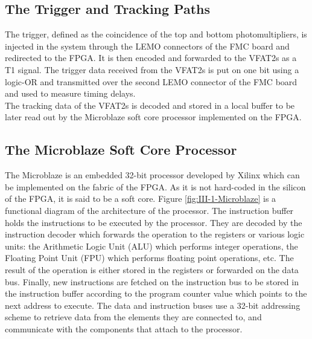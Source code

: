     \subsection{The Trigger and Tracking Paths}

      The trigger, defined as the coincidence of the top and bottom photomultipliers, is injected in the system through the LEMO connectors of the FMC board and redirected to the FPGA. It is then encoded and forwarded to the VFAT2s as a T1 signal. The trigger data received from the VFAT2s is put on one bit using a logic-OR and transmitted over the second LEMO connector of the FMC board and used to measure timing delays. \\

      The tracking data of the VFAT2s is decoded and stored in a local buffer to be later read out by the Microblaze soft core processor implemented on the FPGA.

    \subsection{The Microblaze Soft Core Processor}

      The Microblaze \cite{Microblaze} is an embedded 32-bit processor developed by Xilinx which can be implemented on the fabric of the FPGA. As it is not hard-coded in the silicon of the FPGA, it is said to be a soft core. Figure \ref{fig:III-1-Microblaze} is a functional diagram of the architecture of the processor. The instruction buffer holds the instructions to be executed by the processor. They are decoded by the instruction decoder which forwards the operation to the registers or various logic units: the Arithmetic Logic Unit (ALU) which performs integer operations, the Floating Point Unit (FPU) which performs floating point operations, etc. The result of the operation is either stored in the registers or forwarded on the data bus. Finally, new instructions are fetched on the instruction bus to be stored in the instruction buffer according to the program counter value which points to the next address to execute. The data and instruction buses use a 32-bit addressing scheme to retrieve data from the elements they are connected to, and communicate with the components that attach to the processor. \\

